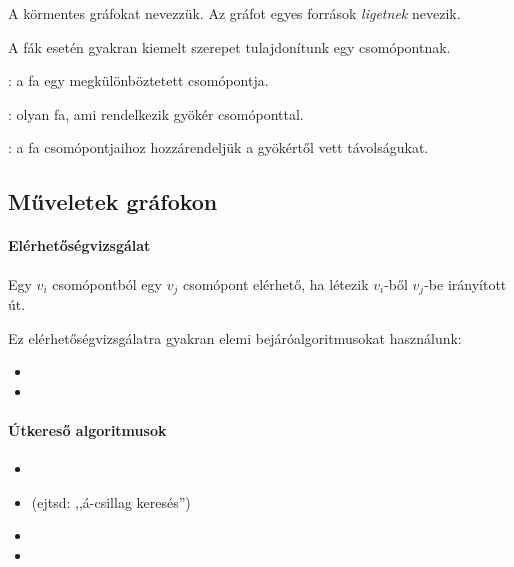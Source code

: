 \begin{definicio}
	A körmentes gráfokat  nevezzük. Az  gráfot egyes források \emph{ligetnek} nevezik.
\end{definicio}

A fák esetén gyakran kiemelt szerepet tulajdonítunk egy csomópontnak.

\begin{definicio}
	: a fa egy megkülönböztetett csomópontja.
\end{definicio}

\begin{definicio}
	: olyan fa, ami rendelkezik gyökér csomóponttal.
\end{definicio}

\begin{definicio}
	: a fa csomópontjaihoz hozzárendeljük a gyökértől vett távolságukat.
\end{definicio}

\subsection{Műveletek gráfokon}

\paragraph{Elérhetőségvizsgálat}

Egy $v_i$ csomópontból egy $v_j$ csomópont elérhető, ha létezik $v_i$-ből $v_j$-be irányított út.

Ez elérhetőségvizsgálatra gyakran elemi bejáróalgoritmusokat használunk:

\begin{itemize}
\item {}
\item {}
\end{itemize}

\paragraph{Útkereső algoritmusok}

\begin{itemize}
\item {}
\item {} (ejtsd: ,,á-csillag keresés'')
\item {}
\item {}
\end{itemize}

